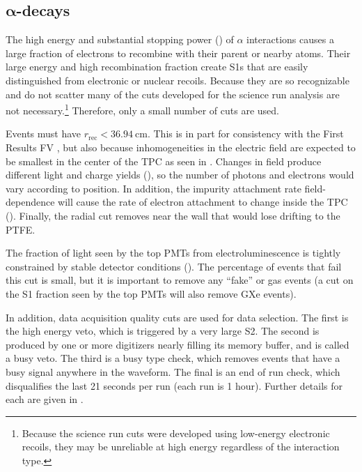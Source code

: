 \subsection[$\alpha$-decays][$\alpha$-decays]{$\boldsymbol{\alpha}$-decays}
\label{subsec:electron_lifetimes_measurement_alphas}
The high energy and substantial stopping power () of $\alpha$ interactions causes a large fraction of
electrons to recombine with their parent or nearby  atoms.  Their large energy and high recombination fraction create S1s that are
easily distinguished from electronic or nuclear recoils.  Because they are so recognizable and do not scatter many of the cuts developed for
the science run analysis are
not necessary.\footnote{Because the science run cuts were developed using low-energy electronic recoils, they may be unreliable at high
energy regardless of the interaction type.}  Therefore, only a small number of cuts are used.

Events must have $r_{\mathrm{rec}} < 36.94\ \mathrm{cm}$.  This is in part for consistency with the First Results FV
, but also because inhomogeneities in the electric field are expected to be smallest in the center of the TPC as
seen in .  Changes in field produce different light and charge yields
(), so the number of photons and electrons would vary according to position.  In addition, the impurity
attachment rate field-dependence will cause the rate of electron attachment to change inside the TPC
().  Finally, the radial cut removes \alphadecays near the wall that would lose drifting
\electron to the PTFE.

The fraction of light seen by the top PMTs from electroluminescence is tightly constrained by stable detector conditions
().  The percentage of events that fail this cut is small, but it is important to remove any
``fake'' or gas events (a cut on the S1 fraction seen by the top PMTs will also remove GXe events).

In addition, data acquisition quality cuts are used for data selection.  The first is the high energy veto, which is triggered by a very
large S2.  The second is produced by one or more digitizers nearly filling its memory buffer, and is called a busy veto.  The third is
a busy type check, which removes events that have a busy signal anywhere in the waveform.  The final is an end of run check, which
disqualifies the last 21 seconds per run (each run is 1 hour).  Further details for each are given in .

